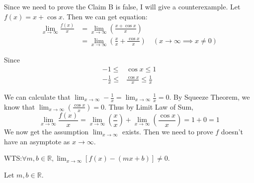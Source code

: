 \documentclass[12pt]{exam}
\newcommand{\vv}{\vspace{.1cm}}
\newcommand{\R}{\mathbb{R}}
\begin{document}
\begin{enumerate}
\begin{enumerate}
		\vv
		
		Since we need to prove the Claim B is false, I will give a counterexample. Let $f(x)=x+\cos{x}.$
		Then we can get equation:
		\begin{align*}
		    \lim_{x \to \infty} \frac{f(x)}{x}&=\lim_{x \to \infty}(\frac{x+\cos{x}}{x}) \\
		    &=\lim_{x \to \infty}(\frac{x}{x}+\frac{\cos{x}}{x})\quad (x \to \infty \implies x \neq 0)
		\end{align*}
		
		Since
		\begin{align*}
		    -1\leq&\cos{x}\leq1\\
		    -\frac{1}{x}\leq&\frac{\cos{x}}{x}\leq\frac{1}{x}
		\end{align*}
		
		We can calculate that $\lim_{x \to \infty}-\frac{1}{x}=\lim_{x \to \infty}\frac{1}{x}=0$. By Squeeze Theorem, we know that $\lim_{x \to \infty}(\frac{\cos{x}}{x})=0$. Thus by Limit Law of Sum,
		$$
		    \lim_{x \to \infty} \frac{f(x)}{x}=\lim_{x \to \infty}(\frac{x}{x})+\lim_{x \to \infty}(\frac{\cos{x}}{x})=1+0=1
		$$
		We now get the assumption $\lim_{x \to \infty}$ exists. Then we need to prove $f$ doesn't have an asymptote as $x \to \infty$.
		
		WTS:$\forall m,b\in\R,\lim_{x \to \infty}[f(x)-(mx+b)]\neq0.$
		
		Let $m,b\in\R.$
		

\end{enumerate}
\end{enumerate}
\end{document}
